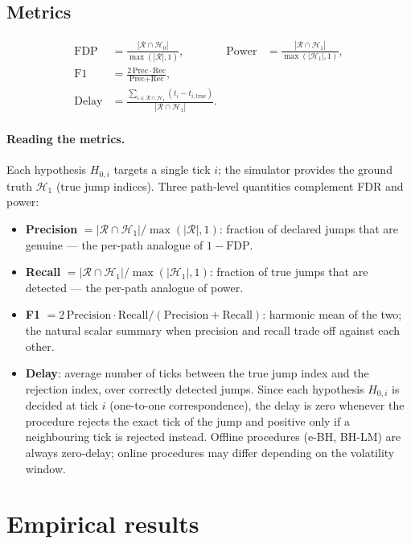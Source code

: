 \documentclass[11pt,a4paper,twocolumn]{article}
\theoremstyle{plain}
\theoremstyle{definition}
\theoremstyle{remark}
\newcommand{\FDP}{\mathrm{FDP}}
\begin{document}
\subsection{Metrics}

\begin{align*}
  \FDP &= \tfrac{|\mathcal{R}\cap\mathcal{H}_0|}{\max(|\mathcal{R}|,1)}, &
  \text{Power} &= \tfrac{|\mathcal{R}\cap\mathcal{H}_1|}{\max(|\mathcal{H}_1|,1)},\\
  \text{F1} &= \tfrac{2\,\text{Prec}\cdot\text{Rec}}{\text{Prec}+\text{Rec}},\\
  \text{Delay} &= \tfrac{\sum_{i\in\mathcal{R}\cap\mathcal{H}_1}(t_i-t_{i,\text{true}})}{|\mathcal{R}\cap\mathcal{H}_1|}.
\end{align*}

\paragraph{Reading the metrics.}
Each hypothesis $H_{0,i}$ targets a single tick $i$; the simulator provides
the ground truth $\mathcal{H}_1$ (true jump indices). Three path-level
quantities complement FDR and power:
\begin{itemize}[noitemsep]
  \item \textbf{Precision} $= |\mathcal{R}\cap\mathcal{H}_1|/\max(|\mathcal{R}|,1)$:
    fraction of declared jumps that are genuine --- the per-path analogue of
    $1 - \mathrm{FDP}$.
  \item \textbf{Recall} $= |\mathcal{R}\cap\mathcal{H}_1|/\max(|\mathcal{H}_1|,1)$:
    fraction of true jumps that are detected --- the per-path analogue of
    power.
  \item \textbf{F1} $= 2\,\mathrm{Precision}\cdot\mathrm{Recall}/(\mathrm{Precision}+\mathrm{Recall})$:
    harmonic mean of the two; the natural scalar summary when precision and
    recall trade off against each other.
  \item \textbf{Delay}: average number of ticks between the true jump index
    and the rejection index, over correctly detected jumps. Since each
    hypothesis $H_{0,i}$ is decided at tick $i$ (one-to-one correspondence),
    the delay is zero whenever the procedure rejects the exact tick of the
    jump and positive only if a neighbouring tick is rejected instead.
    Offline procedures (e-BH, BH-LM) are always zero-delay; online procedures
    may differ depending on the volatility window.
\end{itemize}

\section{Empirical results}
\label{sec:results}
\end{document}
